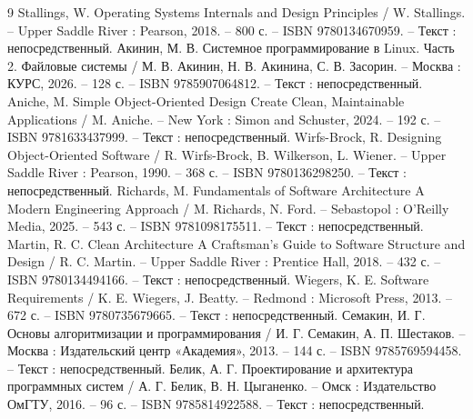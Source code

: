 \begin{thebibliography}{9}
    Stallings, W. Operating Systems Internals and Design Principles / W. Stallings. -- Upper Saddle River : Pearson, 2018. -- 800 с. -- ISBN 9780134670959. -- Текст : непосредственный.
    Акинин, М. В. Системное программирование в Linux. Часть 2. Файловые системы / М. В. Акинин, Н. В. Акинина, С. В. Засорин. -- Москва : КУРС, 2026. -- 128 с. -- ISBN 9785907064812. -- Текст : непосредственный.
    Aniche, M. Simple Object-Oriented Design Create Clean, Maintainable Applications / M. Aniche. -- New York : Simon and Schuster, 2024. -- 192 с. -- ISBN 9781633437999. -- Текст : непосредственный.
    Wirfs-Brock, R. Designing Object-Oriented Software / R. Wirfs-Brock, B. Wilkerson, L. Wiener. -- Upper Saddle River : Pearson, 1990. -- 368 с. -- ISBN 9780136298250. -- Текст : непосредственный.
    Richards, M. Fundamentals of Software Architecture A Modern Engineering Approach / M. Richards, N. Ford. -- Sebastopol : O'Reilly Media, 2025. -- 543 с. -- ISBN 9781098175511. -- Текст : непосредственный.
    Martin, R. C. Clean Architecture A Craftsman's Guide to Software Structure and Design / R. C. Martin. -- Upper Saddle River : Prentice Hall, 2018. -- 432 с. -- ISBN 9780134494166. -- Текст : непосредственный.
    Wiegers, K. E. Software Requirements / K. E. Wiegers, J. Beatty. -- Redmond : Microsoft Press, 2013. -- 672 с. -- ISBN 9780735679665. -- Текст : непосредственный.
    Семакин, И. Г. Основы алгоритмизации и программирования / И. Г. Семакин, А. П. Шестаков. -- Москва : Издательский центр «Академия», 2013. -- 144 с. -- ISBN 9785769594458. -- Текст : непосредственный.
    Белик, А. Г. Проектирование и архитектура программных систем / А. Г. Белик, В. Н. Цыганенко. -- Омск : Издательство ОмГТУ, 2016. -- 96 с. -- ISBN 9785814922588. -- Текст : непосредственный.
\end{thebibliography}

